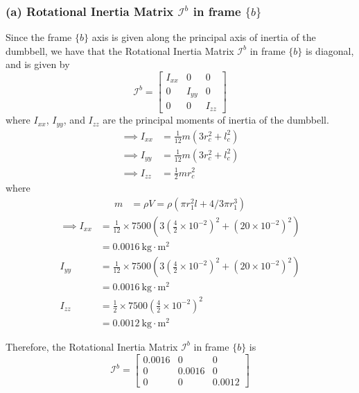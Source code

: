 \subsubsection*{(a) Rotational Inertia Matrix \( \mathcal{I}^{b} \) in frame \( \{b\} \)}

Since the frame \( \{b\} \) axis is given along the principal axis of inertia of the dumbbell, we have that the Rotational Inertia Matrix \( \mathcal{I}^{b} \) in frame \( \{b\} \) is diagonal, and is given by
\begin{equation*}
    \mathcal{I}^{b}=\begin{bmatrix}
        I_{xx} & 0      & 0      \\
        0      & I_{yy} & 0      \\
        0      & 0      & I_{zz}
    \end{bmatrix}
\end{equation*}
where \( I_{xx} \), \( I_{yy} \), and \( I_{zz} \) are the principal moments of inertia of the dumbbell.
\begin{align*}
    \implies
    I_{xx}
     & =
    \frac{1}{12} m\left(3 r_{c}^{2}+l_c^{2}\right)
    \\
    \implies
    I_{yy}
     & =
    \frac{1}{12} m\left(3 r_{c}^{2}+l_c^{2}\right)
    \\
    \implies
    I_{zz}
     & =
    \frac{1}{2} m r_{c}^{2}
\end{align*}
where
\begin{align*}
    m
     & =
    \rho V
    =
    \rho
    \left(\pi r_{1}^{2} l+4 / 3 \pi r_{1}^{3}\right)
\end{align*}
\begin{align*}
    \implies
    I_{xx}
     & =
    \frac{1}{12} \times 7500\left(3\left(\frac{4}{2} \times 10^{-2}\right)^{2}+\left(20 \times 10^{-2}\right)^{2}\right)
    \\ & =
    0.0016 \mathrm{~kg} \cdot \mathrm{m}^{2}
    \\
    I_{yy}
     & =
    \frac{1}{12} \times 7500\left(3\left(\frac{4}{2} \times 10^{-2}\right)^{2}+\left(20 \times 10^{-2}\right)^{2}\right)
    \\ & =
    0.0016 \mathrm{~kg} \cdot \mathrm{m}^{2}
    \\
    I_{zz}
     & =
    \frac{1}{2} \times 7500\left(\frac{4}{2} \times 10^{-2}\right)^{2}
    \\ & =
    0.0012 \mathrm{~kg} \cdot \mathrm{m}^{2}
\end{align*}

Therefore, the Rotational Inertia Matrix \( \mathcal{I}^{b} \) in frame \( \{b\} \) is
\begin{equation*}
    \boxed{
        \mathcal{I}^{b}
        =
        \begin{bmatrix}
            0.0016 & 0      & 0      \\
            0      & 0.0016 & 0      \\
            0      & 0      & 0.0012
        \end{bmatrix}
    }
\end{equation*}

